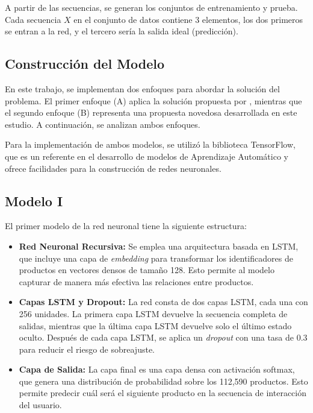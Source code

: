 \documentclass[runningheads]{llncs}
\begin{document}
A partir de las secuencias, se generan los conjuntos de entrenamiento y prueba. Cada secuencia $X$ en el conjunto de datos contiene 3 elementos, los dos primeros se entran a la red, y el tercero sería la salida ideal (predicción).

\subsection{Construcción del Modelo}
	En este trabajo, se implementan dos enfoques para abordar la solución del problema. El primer enfoque (A) aplica la solución propuesta por , mientras que el segundo enfoque (B) representa una propuesta novedosa desarrollada en este estudio. A continuación, se analizan ambos enfoques.
	
	Para la implementación de ambos modelos, se utilizó la biblioteca TensorFlow, que es un referente en el desarrollo de modelos de Aprendizaje Automático y ofrece facilidades para la construcción de redes neuronales.
	
	\subsection{Modelo I}
	El primer modelo de la red neuronal tiene la siguiente estructura:
	\begin{itemize}
	    \item \textbf{Red Neuronal Recursiva:} Se emplea una arquitectura basada en LSTM, que incluye una capa de \textit{embedding} para transformar los identificadores de productos en vectores densos de tamaño 128. Esto permite al modelo capturar de manera más efectiva las relaciones entre productos.
	    
	    \item \textbf{Capas LSTM y Dropout:} La red consta de dos capas LSTM, cada una con 256 unidades. La primera capa LSTM devuelve la secuencia completa de salidas, mientras que la última capa LSTM devuelve solo el último estado oculto. Después de cada capa LSTM, se aplica un \textit{dropout} con una tasa de $0.3$ para reducir el riesgo de sobreajuste.
	    
	    \item \textbf{Capa de Salida:} La capa final es una capa densa con activación softmax, que genera una distribución de probabilidad sobre los 112,590 productos. Esto permite predecir cuál será el siguiente producto en la secuencia de interacción del usuario.
	\end{itemize}
\end{document}
